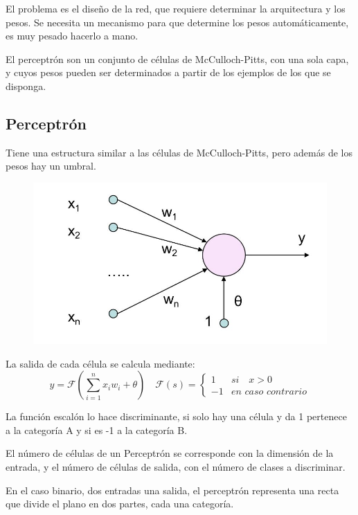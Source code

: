 \documentclass[12pt, twoside, openright]{report} %
\begin{document}
El problema es el diseño de la red, que requiere determinar la arquitectura y los pesos. Se necesita un mecanismo para que determine los pesos automáticamente, es muy pesado hacerlo a mano.

El perceptrón son un conjunto de células de McCulloch-Pitts, con una sola capa, y cuyos pesos pueden ser determinados a partir de los ejemplos de los que se disponga.
\pagebreak

\subsection{Perceptrón}
Tiene una estructura similar a las células de McCulloch-Pitts, pero además de los pesos hay un umbral.
\begin{figure}[H]
	{\includegraphics[scale=.35]{perceptron.jpg}}
\end{figure}

La salida de cada célula se calcula mediante:
$$y=\mathcal{F}\left(\sum_{i=1}^n x_i w_i+\theta\right) \quad \mathcal{F}(s) = \begin{cases}1 & \textit{si}\quad x> 0\\-1 & \textit{en caso contrario}\end{cases}$$

La función escalón lo hace discriminante, si solo hay una célula y da 1 pertenece a la categoría A y si es -1 a la categoría B.

El número de células de un Perceptrón se corresponde con la dimensión de la entrada, y el número de células de salida, con el número de clases a discriminar.

En el caso binario, dos entradas una salida, el perceptrón representa una recta que divide el plano en dos partes, cada una categoría.
\end{document}
